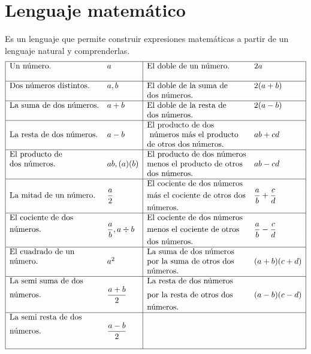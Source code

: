 \section{Lenguaje matemático}
Es un lenguaje que permite construir expresiones matemáticas a partir de un lenguaje natural y comprenderlas.
$$
\begin{array}{|ll|ll|}
\hline
\text{Un número.} & a & \text{El doble de un número.} & 2a \\
& & & \\
\hline
\text{Dos números distintos.} & a, b & \text{El doble de la suma de} & 2(a+b) \\
& &\text{dos números.}& \\
\hline
\text{La suma de dos números.} & a + b & \text{El doble de la resta de} & 2(a-b) \\
& &\text{dos números.}& \\
\hline
& & \text{El producto de dos} & \\
\text{La resta de dos números.} & a - b &\text{ números más el producto} & ab+cd \\
& &\text{de otros dos números.} & \\
\hline
\text{El producto de} & & \text{El producto de dos números} & \\
\text{dos números.}& ab, (a)(b) &\text{menos el producto de otros} & ab-cd \\
& &\text{dos números.} & \\
\hline
 & & \text{El cociente de dos números} & \\
\text{La mitad de un número.} & \dfrac{a}{2} &\text{más el cociente de otros dos}& \dfrac{a}{b}+\dfrac{c}{d} \\
& &\text{números.}& \\
\hline
\text{El cociente de dos} & & \text{El cociente de dos números} & \\
\text{números.}& \dfrac{a}{b}, a \div b &\text{menos el cociente de otros}& \dfrac{a}{b}-\dfrac{c}{d} \\
& &\text{dos números.} & \\
\hline
\text{El cuadrado de un} & & \text{La suma de dos números} & \\
\text{número.}& a^2 &\text{por la suma de otros dos} & (a+b)(c+d) \\
& &\text{números.} & \\
\hline
\text{La semi suma de dos} & & \text{La resta de dos números} & \\
\text{números.}& \dfrac{a+b}{2} &\text{por la resta de otros dos}& (a-b)(c-d) \\
& &\text{números.} & \\
\hline
\text{La semi resta de dos} & & & \\
\text{números.}& \dfrac{a-b}{2} & & \\
& & & \\
\hline
\end{array}
$$

